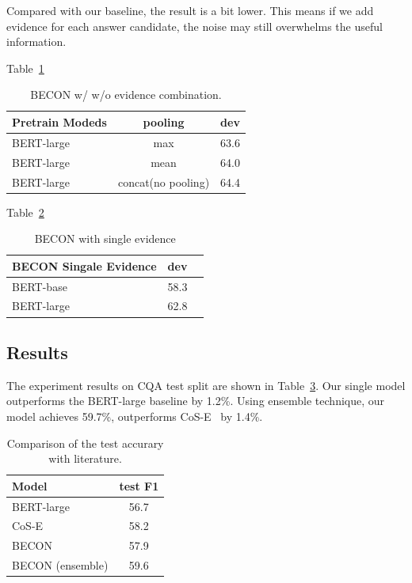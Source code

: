 \documentclass[letterpaper]{article} %
\begin{document}
{Compared with our baseline, the result is a bit lower. This means if we add evidence for each answer candidate, the noise may still overwhelms the useful information.

Table~\ref{table:becon_both}

\begin{table}[t!]
  \centering
  \begin{tabular}{l c c}
  \hline\hline
  {\bf Pretrain Modeds}  & {\bf pooling } & {\bf dev}  \\
  \hline
  BERT-large & max & 63.6 \\
  BERT-large & mean & 64.0 \\
  BERT-large & concat(no pooling) & 64.4 \\
  \end{tabular}
  \caption{BECON w/ w/o evidence combination.}
  \label{table:becon_both}
\end{table}

Table~\ref{table:becon_question}

\begin{table}[t!]
  \centering
  \begin{tabular}{l c c}
  \hline\hline
  {\bf BECON Singale Evidence}  & {\bf dev}  \\
  \hline
  BERT-base & 58.3 \\
  BERT-large & 62.8 \\
  \end{tabular}
  \caption{BECON with single evidence}
  \label{table:becon_question}
\end{table}

\subsection{Results}

The experiment results on CQA test split are shown in Table~\ref{table:final_result}. Our single model outperforms the BERT-large baseline by 1.2\%. Using ensemble technique, our model achieves 59.7\%, outperforms CoS-E~\cite{rajani2019explain} by 1.4\%.

\begin{table}[t]
  \centering
  \small
  \begin{tabular}{l c}
  \hline
  {\bf Model}  & {\bf test F1 } \\
  \hline\hline
  BERT-large~\cite{talmor2018commonsenseqa} & 56.7  \\
  \hline
  CoS-E~\cite{rajani2019explain} & 58.2  \\
  \hline
  BECON  & 57.9 \\
  BECON (ensemble)    & 59.6 \\
  \hline
  \end{tabular}
  \caption{Comparison of the test accurary with literature.}
  \label{table:final_result}
\end{table}

}
\end{document}
